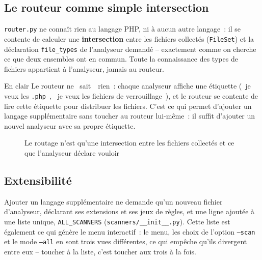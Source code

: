 \documentclass[12pt,a4paper,oneside]{report}
\begin{document}
\subsection{Le routeur comme simple intersection}
\texttt{router.py} ne conna\^it rien au langage PHP, ni \`a aucun autre langage~: il se contente de calculer une \textbf{intersection} entre les fichiers collect\'es (\texttt{FileSet}) et la d\'eclaration \texttt{file\_types} de l'analyseur demand\'e -- exactement comme on cherche ce que deux ensembles ont en commun. Toute la connaissance des types de fichiers appartient \`a l'analyseur, jamais au routeur.

\begin{infobox}{En clair}
Le routeur ne \guillemotleft~sait~\guillemotright\ rien~: chaque analyseur affiche une \'etiquette (\guillemotleft~je veux les \texttt{.php}~\guillemotright, \guillemotleft~je veux les fichiers de verrouillage~\guillemotright), et le routeur se contente de lire cette \'etiquette pour distribuer les fichiers. C'est ce qui permet d'ajouter un langage suppl\'ementaire sans toucher au routeur lui-m\^eme~: il suffit d'ajouter un nouvel analyseur avec sa propre \'etiquette.
\end{infobox}

\begin{figure}[H]
\centering
{}
\caption{Le routage n'est qu'une intersection entre les fichiers collect\'es et ce que l'analyseur d\'eclare vouloir}
\label{fig:routage-intersection}
\end{figure}

\subsection{Extensibilit\'e}
Ajouter un langage suppl\'ementaire ne demande qu'un nouveau fichier d'analyseur, d\'eclarant ses extensions et ses jeux de r\`egles, et une ligne ajout\'ee \`a une liste unique, \texttt{ALL\_SCANNERS} (\texttt{scanners/\_\_init\_\_.py}). Cette liste est \'egalement ce qui g\'en\`ere le menu interactif~: le menu, les choix de l'option \texttt{--scan} et le mode \texttt{--all} en sont trois vues diff\'erentes, ce qui emp\^eche qu'ils divergent entre eux -- toucher \`a la liste, c'est toucher aux trois \`a la fois.
\end{document}

